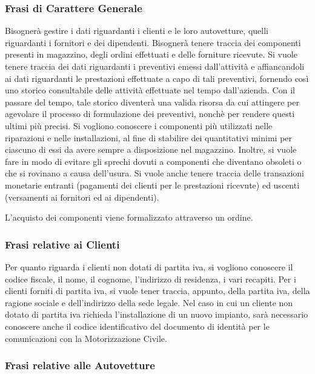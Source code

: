 		\subsubsection{Frasi di Carattere Generale}
					
			Bisognerà gestire i dati riguardanti i clienti e le loro autovetture, quelli riguardanti i fornitori e dei dipendenti. Bisognerà tenere traccia dei componenti presenti in magazzino, degli ordini effettuati e delle forniture ricevute.
			Si vuole tenere traccia dei dati riguardanti i preventivi emessi dall'attività e affiancandoli ai dati riguardanti le prestazioni effettuate a capo di tali preventivi, fornendo così uno storico consultabile delle attività effettuate nel tempo dall'azienda. Con il passare del tempo, tale storico diventerà una valida risorsa da cui attingere per agevolare il processo di formulazione dei preventivi, nonchè per rendere questi ultimi più precisi.
			Si vogliono conoscere i componenti più utilizzati nelle riparazioni e nelle installazioni, al fine di stabilire dei quantitativi minimi per ciascuno di essi da avere sempre a disposizione nel magazzino. Inoltre, si vuole fare in modo di evitare gli sprechi dovuti a componenti che diventano obsoleti o che si rovinano a causa dell'usura.
			Si vuole anche tenere traccia delle transazioni monetarie entranti (pagamenti dei clienti per le prestazioni ricevute) ed uscenti (versamenti ai fornitori ed ai dipendenti).
			
			L'acquisto dei componenti viene formalizzato attraverso un ordine.
			
		\subsubsection{Frasi relative ai Clienti}
		
			Per quanto riguarda i clienti non dotati di partita iva, si vogliono conoscere il codice fiscale, il nome, il cognome, l’indirizzo di residenza, i vari recapiti. Per i clienti forniti di partita iva, si vuole tener traccia, appunto, della partita iva, della ragione sociale e dell’indirizzo della sede legale. 
			Nel caso in cui un cliente non dotato di partita iva richieda l’installazione di un nuovo impianto, sarà necessario conoscere anche il codice identificativo del documento di identità per le comunicazioni con la Motorizzazione Civile.
		
		\subsubsection{Frasi relative alle Autovetture}
			
